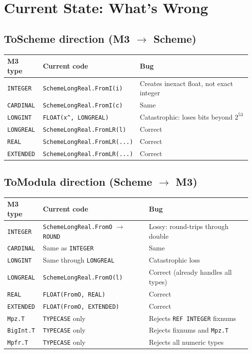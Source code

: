 \documentclass[11pt]{article}
\begin{document}
\section{Current State: What's Wrong}

\subsection{ToScheme direction (M3 $\to$ Scheme)}

\begin{center}
\begin{tabular}{lll}
\toprule
\textbf{M3 type} & \textbf{Current code} & \textbf{Bug} \\
\midrule
\texttt{INTEGER}  & \texttt{SchemeLongReal.FromI(i)} & Creates inexact float, not exact integer \\
\texttt{CARDINAL} & \texttt{SchemeLongReal.FromI(c)} & Same \\
\texttt{LONGINT}  & \texttt{FLOAT(x\^{}, LONGREAL)} & Catastrophic: loses bits beyond $2^{53}$ \\
\texttt{LONGREAL} & \texttt{SchemeLongReal.FromLR(l)} & Correct \\
\texttt{REAL}     & \texttt{SchemeLongReal.FromLR(...)} & Correct \\
\texttt{EXTENDED} & \texttt{SchemeLongReal.FromLR(...)} & Correct \\
\bottomrule
\end{tabular}
\end{center}

\subsection{ToModula direction (Scheme $\to$ M3)}

\begin{center}
\begin{tabular}{lll}
\toprule
\textbf{M3 type} & \textbf{Current code} & \textbf{Bug} \\
\midrule
\texttt{INTEGER}  & \texttt{SchemeLongReal.FromO} $\to$ \texttt{ROUND} & Lossy: round-trips through double \\
\texttt{CARDINAL} & Same as \texttt{INTEGER} & Same \\
\texttt{LONGINT}  & Same through \texttt{LONGREAL} & Catastrophic loss \\
\texttt{LONGREAL} & \texttt{SchemeLongReal.FromO(l)} & Correct (already handles all types) \\
\texttt{REAL}     & \texttt{FLOAT(FromO, REAL)} & Correct \\
\texttt{EXTENDED} & \texttt{FLOAT(FromO, EXTENDED)} & Correct \\
\texttt{Mpz.T}   & \texttt{TYPECASE} only & Rejects \texttt{REF INTEGER} fixnums \\
\texttt{BigInt.T} & \texttt{TYPECASE} only & Rejects fixnums and \texttt{Mpz.T} \\
\texttt{Mpfr.T}  & \texttt{TYPECASE} only & Rejects all numeric types \\
\bottomrule
\end{tabular}
\end{center}
\end{document}
